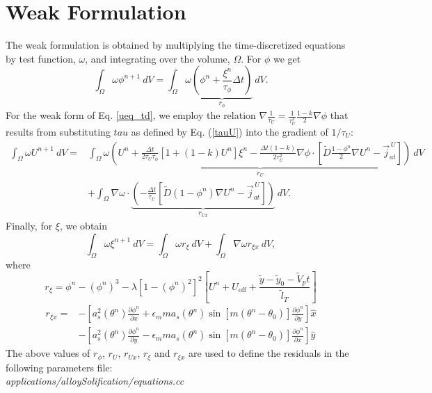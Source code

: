 \documentclass[10pt]{article}
\begin{document}
\section{Weak Formulation}
The weak formulation is obtained by multiplying the time-discretized equations by test function, $\omega$, and integrating over the volume, $\Omega$. For $\phi$ we get
\begin{equation}
\int_{\Omega}   \omega  \phi^{n+1}  ~dV = \int_{\Omega}   \omega \underbrace{\left(\phi^n + \frac{ \xi^n}{\tau_\phi}\Delta t\right)}_{r_{\phi}} ~dV.
\end{equation}
For the weak form of Eq. \ref{ueq_td}, we employ the relation $\nabla \frac{1}{\tau_U}=\frac{1}{\tau_U^2}\frac{1-k}{2}\nabla\phi$ that results from substituting $tau$ as defined by Eq. (\ref{tauU}) into the gradient of $1/\tau_U$:
\begin{equation}
\begin{split}
\int_{\Omega}   \omega  U^{n+1}  ~dV =& 
\int_{\Omega} \omega \underbrace{ \left( U^{n} + \frac{\Delta t}{2\tau_U\tau_\phi}[1+(1-k)U^n]\xi^n  - \frac{\Delta t (1-k)}{2\tau_U^2} \nabla \phi \cdot \left[\tilde{D}\frac{1-\phi^n}{2}\nabla U^n-\vec{j}_{at}^{\,U}\right] \right) }_{r_U}~dV\\
&+\int_{\Omega}  \nabla  \omega  \cdot \underbrace{\left( -\frac{\Delta t}{\tau_U}\left[\tilde{D}(1-\phi^n)\nabla U^n-\vec{j}_{at}^{\,U}\right] \right)}_{r_{Ux}}~dV.
\end{split}
\end{equation}
Finally, for $\xi$, we obtain
\begin{equation}
\int_{\Omega}   \omega \xi^{n+1} ~dV =\int_{\Omega} \omega r_\xi ~dV + \int_{\Omega} \nabla \omega r_{\xi x} ~dV,
\end{equation}
where
\begin{equation}
r_\xi= \phi^n-(\phi^n)^3 - \lambda \left[1-(\phi^n)^2\right]^2 \left[ U^n + U_\text{off} + \frac{\tilde{y} - \tilde{y}_0 - \tilde{V}_p t}{\tilde{l}_T} \right]
\end{equation}
\begin{equation}
\begin{split}
r_{\xi x}= &-\left[a_s^2(\theta^n) \frac{\partial \phi^n}{\partial x} + \epsilon_m m a_s(\theta^n) \sin \left[ m \left(\theta^n - \theta_0 \right) \right] \frac{\partial \phi^n}{\partial y}\right]\hat{x}\\
&-\left[a_s^2(\theta^n) \frac{\partial \phi^n}{\partial y} - \epsilon_m m a_s(\theta^n) \sin \left[ m \left(\theta^n - \theta_0 \right) \right] \frac{\partial \phi^n}{\partial x}\right]\hat{y}
\end{split}
\end{equation}
\vskip 0.25in
The above values of $r_{\phi}$, $r_{U}$, $r_{Ux}$,  $r_{\xi}$ and  $r_{\xi x}$ are used to define the residuals in the following parameters file: \\
\textit{applications/alloySolification/equations.cc}
\end{document}
